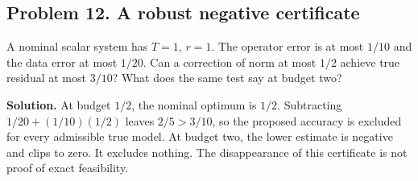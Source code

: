 \subsection*{Problem 12. A robust negative certificate}
A nominal scalar system has $T=1$, $r=1$. The operator error is at most $1/10$ and the data error at most $1/20$. Can a correction of norm at most $1/2$ achieve true residual at most $3/10$? What does the same test say at budget two?

\textbf{Solution.} At budget $1/2$, the nominal optimum is $1/2$. Subtracting $1/20+(1/10)(1/2)$ leaves $2/5>3/10$, so the proposed accuracy is excluded for every admissible true model. At budget two, the lower estimate is negative and clips to zero. It excludes nothing. The disappearance of this certificate is not proof of exact feasibility.
